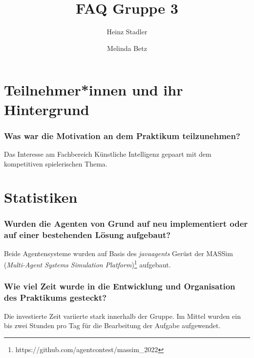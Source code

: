 \documentclass[runningheads]{llncs}
\begin{document}
	\title{FAQ Gruppe 3}
	\author{Heinz Stadler \and
		Melinda Betz}
	\maketitle              %
	
	\section{Teilnehmer*innen und ihr Hintergrund}
	\subsubsection{Was war die Motivation an dem Praktikum teilzunehmen?\\}
	Das Interesse am Fachbereich Künstliche Intelligenz gepaart mit dem kompetitiven spielerischen Thema.
	
	\section{Statistiken}
	\subsubsection{Wurden die Agenten von Grund auf neu implementiert oder auf einer bestehenden Lösung aufgebaut?\\}
	Beide Agentensysteme wurden auf Basis des \textit{javaagents} Gerüst der MASSim (\textit{Multi-Agent Systems Simulation Platform})\footnote{https://github.com/agentcontest/massim\_2022} aufgebaut.
	\subsubsection{Wie viel Zeit wurde in die Entwicklung und Organisation des Praktikums gesteckt?\\}
	Die investierte Zeit variierte stark innerhalb der Gruppe. Im Mittel wurden ein bis zwei Stunden pro Tag für die Bearbeitung der Aufgabe aufgewendet.
\end{document}
